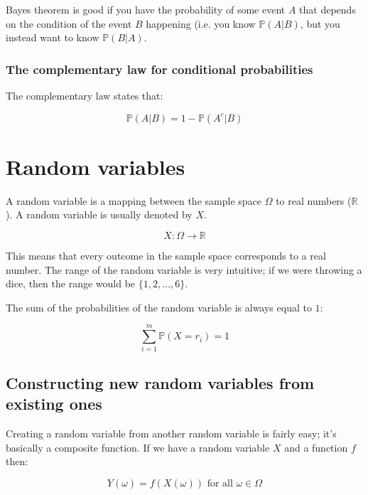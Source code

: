 Bayes theorem is good if you have the probability of some event $A$ that depends
on the condition of the event $B$ happening (i.e. you know $\mathbb{P}(A|B)$,
but you instead want to know $\mathbb{P}(B|A)$.

\subsubsection{The complementary law for conditional probabilities}

The complementary law states that:

\begin{dmath}
	\mathbb{P}(A|B) = 1 - \mathbb{P}(A^c|B)
\end{dmath}

\section{Random variables}

A random variable is a mapping between the sample space $\Omega$ to real numbers
($\mathbb{R}$). A random variable is usually denoted by $X$.

\begin{dmath}
	X : \Omega \rightarrow \mathbb{R}
\end{dmath}

This means that every outcome in the sample space corresponds to a real number.
The range of the random variable is very intuitive; if we were throwing a dice,
then the range would be $\{1, 2, \dots, 6\}$.

The sum of the probabilities of the random variable is always equal to $1$:

\begin{dmath}
	\sum\limits_{i=1}^m\mathbb{P}(X=r_i) = 1
\end{dmath}

\subsection{Constructing new random variables from existing ones}
\label{subsec:new_random_vars}
Creating a random variable from another random variable is fairly easy; it's
basically a composite function. If we have a random variable $X$ and a function
$f$ then:

\begin{dmath}
	Y(\omega) = f(X(\omega)) \textrm{ for all $\omega \in \Omega$}
\end{dmath}

